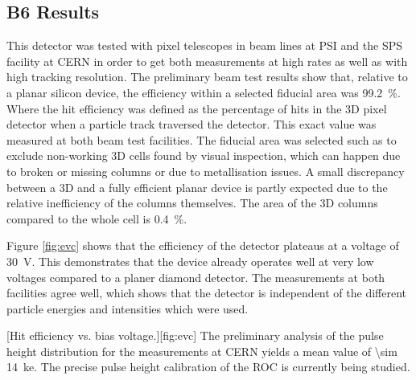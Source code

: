 \subsection{B6 Results}
This detector was tested with pixel telescopes in beam lines at \ac{PSI} and the SPS facility at CERN in order to get both measurements at high rates as well as with high tracking resolution. The preliminary beam test results show that, relative to a planar silicon device, the efficiency within a selected fiducial area was \SI{99.2}{\%}. Where the hit efficiency was defined as the percentage of hits in the 3D pixel detector when a particle track traversed the detector. This exact value was measured at both beam test facilities. The fiducial area was selected such as to exclude non-working 3D cells found by visual inspection, which can happen due to broken or missing columns or due to metallisation issues. A small discrepancy between a 3D and a fully efficient planar device is partly expected due to the relative inefficiency of the columns themselves. The area of the 3D columns compared to the whole cell is \SI{.4}{\%}. \par 
Figure \vref{fig:evc} shows that the efficiency of the detector plateaus at a voltage of \SI{30}{\volt}. This demonstrates that the device already operates well at very low voltages compared to a planer diamond detector. The measurements at both facilities agree well, which shows that the detector is independent of the different particle energies and intensities which were used.\par 
{}[Hit efficiency vs. bias voltage.][fig:evc]
The preliminary analysis of the pulse height distribution for the measurements at CERN yields a mean value of \SI{\sim 14}{\kilo e}. The precise pulse height calibration of the \ac{ROC} is currently being studied.
